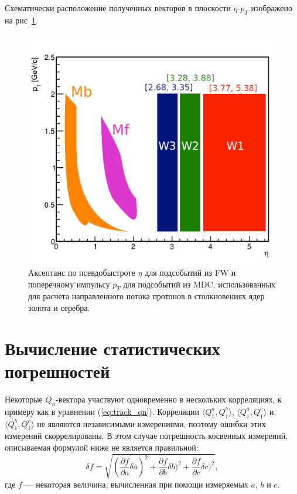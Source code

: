 Схематически расположение полученных векторов в плоскости $\eta$-$p_T$ изображено на рис~\ref{fig:hades_qvectors}.
%
\begin{figure}[ht]
\begin{center}
\includegraphics[width=0.75\linewidth]{images/eta_pt_qvectors.png}
\caption{Aксептанс по псевдобыстроте $\eta$ для подсобытий из FW и поперечному импульсу $p_T$ для подсобытий из MDC, использованных для расчета направленного потока протонов в столкновениях ядер золота и серебра.}
\label{fig:hades_qvectors}
\end{center}
\end{figure}
%

\section{Вычисление статистических погрешностей}

Некоторые $Q_n$-вектора участвуют одновременно в нескольких корреляциях, к примеру как в уравнении (\ref{eq:track_qn}).
Корреляции $\langle Q_1^a, Q_1^b \rangle$, $\langle Q_1^a, Q_1^c \rangle$ и $\langle Q_1^b, Q_1^c \rangle$ не являются независимыми измерениями, поэтому ошибки этих измерений скоррелированы.
В этом случае погрешность косвенных измерений, описываемая формулой ниже не является правильной:
\begin{equation}
    \delta f = \sqrt{ ( \frac{\partial f}{\partial a} \delta a )^2 + \frac{\partial f}{\partial b} \delta b )^2 + \frac{\partial f}{\partial c} \delta c )^2 },
\end{equation}
где $f$ --- некоторая величина, вычисленная при помощи измеряемых $a$, $b$ и $c$.

